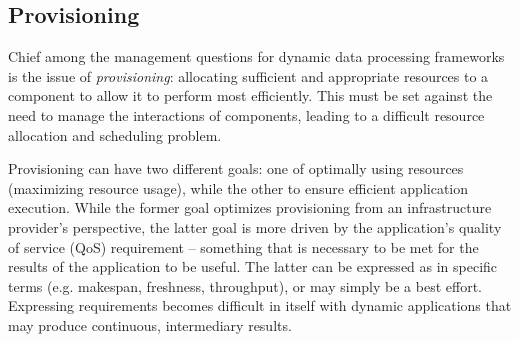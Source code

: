 



\subsection{Provisioning}

Chief among the management questions for dynamic data processing frameworks is the
issue of \emph{provisioning}: allocating sufficient and appropriate
resources to a component to allow it to perform most efficiently. This
must be set against the need to manage the interactions of components,
leading to a difficult resource allocation and scheduling problem.

Provisioning can have two different goals: one of optimally using
resources (maximizing resource usage), while the other to ensure
efficient application execution. While the former goal optimizes
provisioning from an infrastructure provider's perspective, the latter
goal is more driven by the application's quality of service (QoS) requirement -- something that
is necessary to be met for the results of the application to be
useful. The latter can be expressed as in specific terms (e.g. makespan, freshness, throughput), or may
simply be a best effort. Expressing requirements becomes difficult in
itself with dynamic applications that may produce continuous,
intermediary results.

